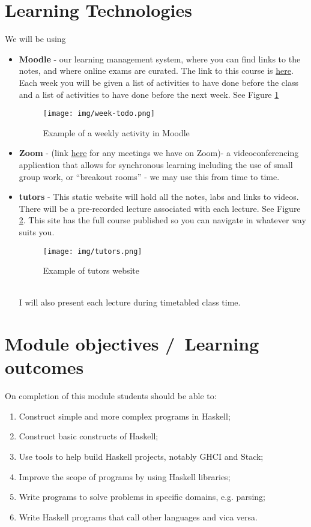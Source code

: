 \documentclass{article}
\begin{document}
\section{Learning Technologies}
We will be using 
\begin{itemize}
    \item \textbf{Moodle} - our learning management system, where you can find links to the notes, and where online exams are curated. The link to this course is \href{https://join.slack.com/t/functprog22/shared_invite/zt-11nr3172s-6T6eSGwcZoUvkRio95rxwA}{here}.  
Each week you will be given a list of activities to have done before the class and a list of activities to have done before the next week. See Figure \ref{fig:todo}
\begin{figure}[h]
    \centering
    \texttt{[image: img/week-todo.png]}
    \caption{Example of a weekly activity in Moodle}
    \label{fig:todo}
\end{figure}


    \item \textbf{Zoom} - (link \href{https://wit-ie.zoom.us/j/94189213426}{here} for any meetings we have on Zoom)-  a videoconferencing application that 
    allows for synchronous learning including the use of small group work, or “breakout rooms” - we may  use this from time to time. 

    \item \textbf{tutors} - This static website will hold all the notes, labs and links to videos. There will be a pre-recorded lecture associated with each lecture. See Figure \ref{tutors}.
    This site has the full course published so you can navigate in whatever way suits you.  
\begin{figure}[h]
    \centering
    \texttt{[image: img/tutors.png]}
    \caption{Example of tutors website}
    \label{tutors}
\end{figure}
\\
I will also present each lecture  during timetabled class time.

\end{itemize}
\pagebreak

\section{Module objectives /\ Learning outcomes}
On completion of this module students should be able to: 
\begin{enumerate}
    \item  Construct simple and more complex programs in Haskell;
    \item  Construct basic constructs of Haskell;
    \item  Use tools to help build Haskell projects, notably GHCI and Stack;
    \item  Improve the scope of programs by using Haskell libraries;
    \item  Write programs to solve problems in specific domains, e.g. parsing;
    \item  Write Haskell programs that call other languages and vica versa.
\end{enumerate}
\end{document}
